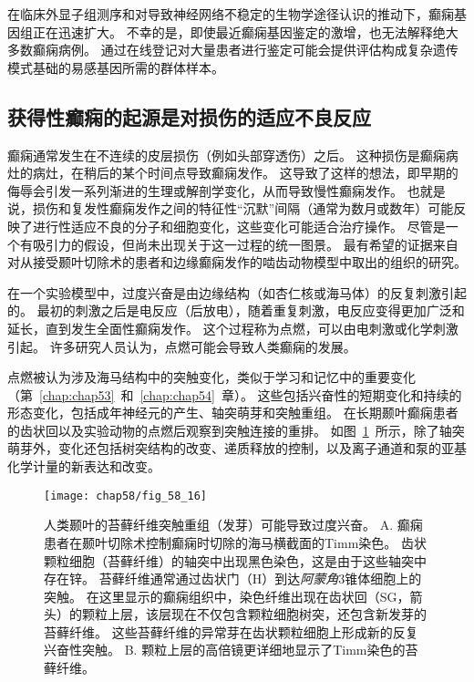 在临床外显子组测序和对导致神经网络不稳定的生物学途径认识的推动下，癫痫基因组正在迅速扩大。
不幸的是，即使最近癫痫基因鉴定的激增，也无法解释绝大多数癫痫病例。
通过在线登记对大量患者进行鉴定可能会提供评估构成复杂遗传模式基础的易感基因所需的群体样本。



\subsection{获得性癫痫的起源是对损伤的适应不良反应}

癫痫通常发生在不连续的皮层损伤（例如头部穿透伤）之后。
这种损伤是癫痫病灶的病灶，在稍后的某个时间点导致癫痫发作。
这导致了这样的想法，即早期的侮辱会引发一系列渐进的生理或解剖学变化，从而导致慢性癫痫发作。
也就是说，损伤和复发性癫痫发作之间的特征性“沉默”间隔（通常为数月或数年）可能反映了进行性适应不良的分子和细胞变化，这些变化可能适合治疗操作。
尽管是一个有吸引力的假设，但尚未出现关于这一过程的统一图景。
最有希望的证据来自对从接受颞叶切除术的患者和边缘癫痫发作的啮齿动物模型中取出的组织的研究。


在一个实验模型中，过度兴奋是由边缘结构（如杏仁核或海马体）的反复刺激引起的。
最初的刺激之后是电反应（后放电），随着重复刺激，电反应变得更加广泛和延长，直到发生全面性癫痫发作。
这个过程称为点燃，可以由电刺激或化学刺激引起。
许多研究人员认为，点燃可能会导致人类癫痫的发展。


点燃被认为涉及海马结构中的突触变化，类似于学习和记忆中的重要变化（第~\ref{chap:chap53}~和~\ref{chap:chap54}~章）。
这些包括兴奋性的短期变化和持续的形态变化，包括成年神经元的产生、轴突萌芽和突触重组。
在长期颞叶癫痫患者的齿状回以及实验动物的点燃后观察到突触连接的重排。
如图~\ref{fig:58_16}~所示，除了轴突萌芽外，变化还包括树突结构的改变、递质释放的控制，以及离子通道和泵的亚基化学计量的新表达和改变。


\begin{figure}[htbp]
	\centering
	\texttt{[image: chap58/fig\_58\_16]}
	\caption{人类颞叶的苔藓纤维突触重组（发芽）可能导致过度兴奋\cite{sutula1989mossy}。
		A. 癫痫患者在颞叶切除术控制癫痫时切除的海马横截面的Timm染色。
		齿状颗粒细胞（苔藓纤维）的轴突中出现黑色染色，这是由于这些轴突中存在锌。
		苔藓纤维通常通过齿状门（H）到达\textit{阿蒙角}3锥体细胞上的突触。
		在这里显示的癫痫组织中，染色纤维出现在齿状回（SG，箭头）的颗粒上层，该层现在不仅包含颗粒细胞树突，还包含新发芽的苔藓纤维。
		这些苔藓纤维的异常芽在齿状颗粒细胞上形成新的反复兴奋性突触。
		B. 颗粒上层的高倍镜更详细地显示了Timm染色的苔藓纤维。}
	\label{fig:58_16}
\end{figure}


